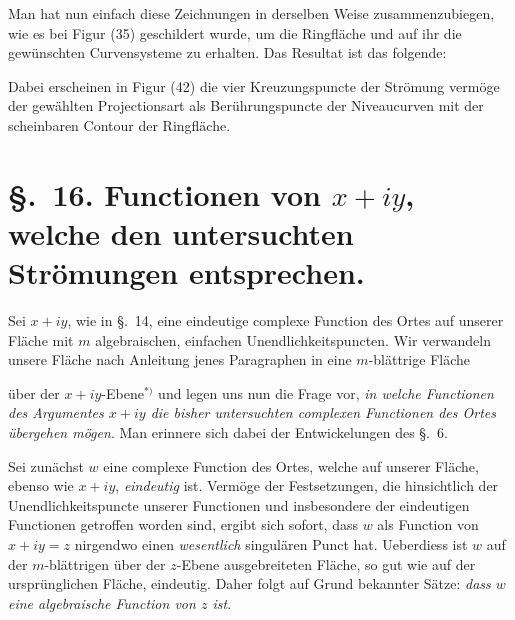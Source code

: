 \documentclass{article}
\begin{document}
Man hat nun einfach diese Zeichnungen in derselben Weise zusammenzubiegen, wie es bei Figur (35) geschildert wurde, um die Ringfläche und auf ihr die gewünschten Curvensysteme zu erhalten. Das Resultat ist das folgende:


Dabei erscheinen in Figur (42) die vier Kreuzungspuncte der Strömung vermöge der gewählten Projectionsart als Berührungspuncte der Niveaucurven mit der scheinbaren Contour der Ringfläche.

\section*{§.~16. Functionen von $x + iy$, welche den untersuchten Strömungen entsprechen.}

Sei $x + iy$, wie in §.~14, eine eindeutige complexe Function des Ortes auf unserer Fläche mit $m$ algebraischen, einfachen Unendlichkeitspuncten. Wir verwandeln unsere Fläche nach Anleitung jenes Paragraphen in eine $m$-blättrige Fläche

über der $x + iy$-Ebene${}^{*)}$ und legen uns nun die Frage vor, \emph{in welche Functionen des Argumentes $x + iy$ die bisher untersuchten complexen Functionen des Ortes übergehen mögen}. Man erinnere sich dabei der Entwickelungen des §.~6.

Sei zunächst $w$ eine complexe Function des Ortes, welche auf unserer Fläche, ebenso wie $x + iy$, \emph{eindeutig} ist. Vermöge der Festsetzungen, die hinsichtlich der Unendlichkeitspuncte unserer Functionen und insbesondere der eindeutigen Functionen getroffen worden sind, ergibt sich sofort, dass $w$ als Function von $x + iy = z$ nirgendwo einen \emph{wesentlich} singulären Punct hat. Ueberdiess ist $w$ auf der $m$-blättrigen über der $z$-Ebene ausgebreiteten Fläche, so gut wie auf der ursprünglichen Fläche, eindeutig. Daher folgt auf Grund bekannter Sätze: \emph{dass $w$ eine algebraische Function von $z$ ist.}
\end{document}
